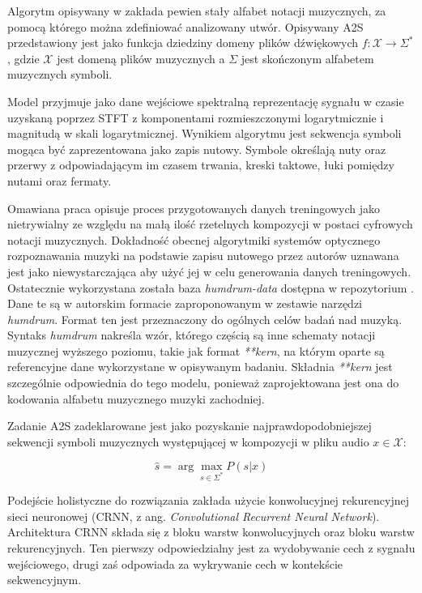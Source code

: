 \documentclass[12pt,a4paper,twoside]{mwart}
\begin{document}
Algorytm opisywany w \cite{Transcription:Pertus:NeuralNetwork} zakłada pewien stały alfabet notacji muzycznych, za pomocą którego można zdefiniować analizowany utwór. Opisywany A2S przedstawiony jest jako funkcja dziedziny domeny plików dźwiękowych $f : \mathcal{X} \rightarrow \Sigma^{\ast}$, gdzie $\mathcal{X}$ jest domeną plików muzycznych a $ \Sigma $ jest skończonym alfabetem muzycznych symboli.

Model przyjmuje jako dane wejściowe spektralną reprezentację sygnału w czasie uzyskaną poprzez STFT z komponentami rozmieszczonymi logarytmicznie i magnitudą w skali logarytmicznej. Wynikiem algorytmu jest sekwencja symboli mogąca być zaprezentowana jako zapis nutowy. Symbole określają nuty oraz przerwy z odpowiadającym im czasem trwania, kreski taktowe, łuki pomiędzy nutami oraz fermaty.

Omawiana praca opisuje proces przygotowanych danych treningowych jako nietrywialny ze względu na małą ilość rzetelnych kompozycji w postaci cyfrowych notacji muzycznych. Dokładność obecnej algorytmiki systemów optycznego rozpoznawania muzyki na podstawie zapisu nutowego przez autorów uznawana jest jako niewystarczająca aby użyć jej w celu generowania danych treningowych. Ostatecznie wykorzystana została baza \textit{humdrum-data} dostępna w repozytorium \cite{Transcription:Sapp:Humdrum}. Dane te są w autorskim formacie zaproponowanym w zestawie narzędzi \textit{humdrum}. Format ten jest przeznaczony do ogólnych celów badań nad muzyką. Syntaks \textit{humdrum} nakreśla wzór, którego częścią są inne schematy notacji muzycznej wyższego poziomu, takie jak format \textit{**kern}, na którym oparte są referencyjne dane wykorzystane w opisywanym badaniu. Składnia \textit{**kern} jest szczególnie odpowiednia do tego modelu, ponieważ zaprojektowana jest ona do kodowania alfabetu muzycznego muzyki zachodniej.

Zadanie A2S zadeklarowane jest jako pozyskanie najprawdopodobniejszej sekwencji symboli muzycznych występującej w kompozycji w pliku audio $x \in \mathcal{X}$:

\begin{equation}
\widehat{s} = \arg \max_{s \in \Sigma^{\ast}} P (s | x)
\end{equation}

Podejście holistyczne do rozwiązania zakłada użycie konwolucyjnej rekurencyjnej sieci neuronowej (CRNN, z ang. \textit{Convolutional Recurrent Neural Network}). Architektura CRNN składa się z bloku warstw konwolucyjnych oraz bloku warstw rekurencyjnych. Ten pierwszy odpowiedzialny jest za wydobywanie cech z sygnału wejściowego, drugi zaś odpowiada za wykrywanie cech w kontekście sekwencyjnym. 
\end{document}
